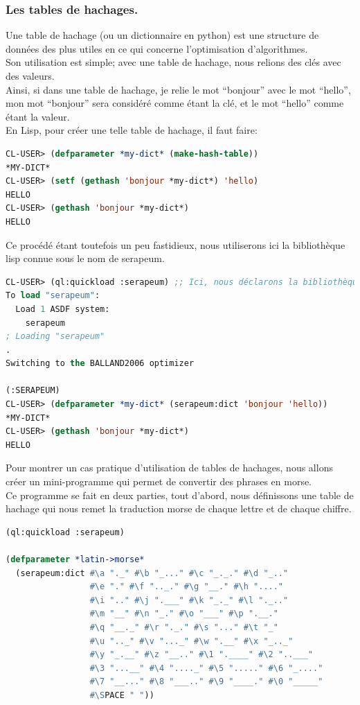 \documentclass[a4paper, 12pt]{article}
\numberwithin{equation}{subsection}
\begin{document}
\subsubsection{Les tables de hachages.}
Une table de hachage (ou un dictionnaire en python) est une structure de données des plus utiles en ce qui concerne l'optimisation d'algorithmes. \\
Son utilisation est simple; avec une table de hachage, nous relions des clés avec des valeurs. \\ Ainsi, si dans une table de hachage, je relie le mot ``bonjour'' avec le mot ``hello'', mon mot ``bonjour'' sera considéré comme étant la clé, et le mot ``hello'' comme étant la valeur. \\
En Lisp, pour créer une telle table de hachage, il faut faire: \\
\begin{lstlisting}[language=Lisp]
CL-USER> (defparameter *my-dict* (make-hash-table))
*MY-DICT*
CL-USER> (setf (gethash 'bonjour *my-dict*) 'hello)
HELLO
CL-USER> (gethash 'bonjour *my-dict*)
HELLO
\end{lstlisting}
Ce procédé étant toutefois un peu fastidieux, nous utiliserons ici la bibliothèque lisp connue sous le nom de serapeum. \\
\begin{lstlisting}[language=Lisp]
CL-USER> (ql:quickload :serapeum) ;; Ici, nous déclarons la bibliothèque.
To load "serapeum":
  Load 1 ASDF system:
    serapeum
; Loading "serapeum"
.
Switching to the BALLAND2006 optimizer

(:SERAPEUM)
CL-USER> (defparameter *my-dict* (serapeum:dict 'bonjour 'hello))
*MY-DICT*
CL-USER> (gethash 'bonjour *my-dict*)
HELLO
\end{lstlisting}
Pour montrer un cas pratique d'utilisation de tables de hachages, nous allons créer un mini-programme qui permet de convertir des phrases en morse. \\
Ce programme se fait en deux parties, tout d'abord, nous définissons une table de hachage qui nous remet la traduction morse de chaque lettre et de chaque chiffre. \\
\begin{lstlisting}[language=Lisp]
(ql:quickload :serapeum)

(defparameter *latin->morse*
  (serapeum:dict #\a "._" #\b "_..." #\c "_._." #\d "_.."
                 #\e "." #\f ".._." #\g "__." #\h "...."
                 #\i ".." #\j ".___" #\k "_._" #\l "._.."
                 #\m "__" #\n "_." #\o "___" #\p ".__."
                 #\q "__._" #\r "._." #\s "..." #\t "_"
                 #\u ".._" #\v "..._" #\w ".__" #\x "_.._"
                 #\y "_.__" #\z "__.." #\1 ".____" #\2 "..___"
                 #\3 "...__" #\4 "...._" #\5 "....." #\6 "_...."
                 #\7 "__..." #\8 "___.." #\9 "____." #\0 "_____"
                 #\SPACE " "))
\end{lstlisting}
\end{document}
